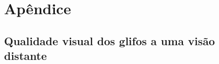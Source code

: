 \documentclass[
    12pt,                %
    oneside,            %
    a4paper,            %
    english,            %
    french,                %
    spanish,            %
    brazil                %
    ]{abntex2}
\begin{document}




\pagebreak
 \chapter{Apêndice}
 \section{Qualidade visual dos glifos a uma visão distante}
 \label{sec::qualidade_visual_longe}



\end{document}
